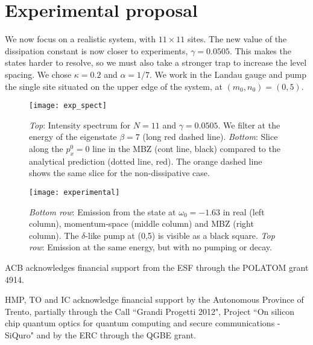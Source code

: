 \documentclass[twocolumn, 10pt, aps, superscriptaddress, floatfix, showpacs, prb, citeautoscript]{revtex4-1}
\begin{document}


\section{Experimental proposal}
\label{sec:experiment}

We now focus on a realistic system, with $11 \times 11$ sites. The new
value of the dissipation constant is now closer to experiments,
$\gamma = 0.0505$. This makes the states harder to resolve, so we must
also take a stronger trap to increase the level spacing. We chose
$\kappa = 0.2$ and $\alpha = 1/7$. We work in the Landau gauge and
pump the single site situated on the upper edge of the system, at
$(m_0,n_0)= (0,5)$.

\begin{figure}[htb]
  \centerline{\texttt{[image: exp\_spect]}}
  \caption{\emph{Top}: Intensity spectrum for $N=11$ and $\gamma = 0.0505$. We filter at the energy of the eigenstate $\beta=7$ (long red dashed line).
\emph{Bottom}: Slice along the $p_x^0 = 0$ line in the MBZ (cont line, black) compared to the analytical prediction (dotted line, red). The orange dashed line shows the same slice for the non-dissipative case.}
  \label{fig:exp_spectrum}
\end{figure}


\begin{figure}[htb]
  \centerline{\texttt{[image: experimental]}}
  \caption{\emph{Bottom row}: Emission from the state at $\omega_0 =
-1.63$ in real (left column), momentum-space (middle column) and MBZ
(right column). The $\delta$-like pump at (0,5) is visible as a black
square.  \emph{Top row}: Emission at the same energy, but with no
pumping or decay.}
  \label{fig:exp_states}
\end{figure}




\acknowledgments

ACB acknowledges financial support from the ESF through the POLATOM grant 4914.

HMP, TO and IC acknowledge financial support by the Autonomous Province of Trento, partially through the Call ``Grandi Progetti 2012", Project ``On silicon chip quantum optics for quantum computing and secure communications - SiQuro" and by the ERC through the QGBE grant.



\end{document}
